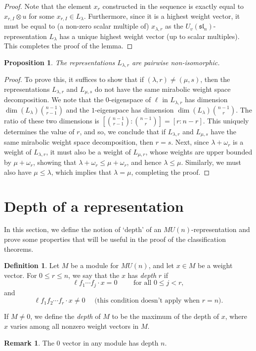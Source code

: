 \documentclass{amsart}
\numberwithin{equation}{section}
\theoremstyle{theorem}
\newtheorem{proposition}[theorem]{Proposition}
\theoremstyle{definition}
\newtheorem{remark}[theorem]{Remark}
\newtheorem{definition}[theorem]{Definition}
\newcommand{\sll}{\mathfrak{sl}}
\newcommand{\uvsln}{U_v(\sll_n)}
\begin{document}
\begin{proof}
Note that the element $x_r$ constructed in the sequence is exactly equal to $x_{r,I}\otimes u$ for some $x_{r,I}\in L_{\lambda}$. Furthermore, since it is a highest weight vector, it must be equal to (a non-zero scalar multiple of) $x_{\lambda,r}$ as the $\uvsln$-representation $L_{\lambda}$ has a unique highest weight vector (up to scalar multiples). This completes the proof of the lemma.
\end{proof}
\begin{proposition} \label{prop:nonisom}
The representations $L_{\lambda,r}$ are pairwise non-isomorphic.
\end{proposition}
\begin{proof}
To prove this, it suffices to show that if $(\lambda, r)\neq (\mu,s)$, then the representations $L_{\lambda,r}$ and $L_{\mu,s}$ do not have the same mirabolic weight space decomposition. We note that the $0$-eigenspace of $\ell$ in $L_{\lambda,r}$ has dimension $\dim(L_{\lambda}){n-1 \choose r-1}$ and the $1$-eigenspace has dimension $\dim(L_{\lambda}){n-1 \choose r}$. The ratio of these two dimensions is $[{n-1 \choose r-1}:{n-1 \choose r}]=[r:n-r]$. This uniquely determines the value of $r$, and so, we conclude that if $L_{\lambda,r}$ and $L_{\mu,s}$ have the same mirabolic weight space decomposition, then $r=s$. Next, since $\lambda+\omega_r$ is a weight of $L_{\lambda,r}$, it must also be a weight of $L_{\mu,r}$, whose weights are upper bounded by $\mu+\omega_r$, showing that $\lambda+\omega_r\leq \mu+\omega_r$, and hence $\lambda\leq\mu$. Similarly, we must also have $\mu\leq \lambda$, which implies that $\lambda=\mu$, completing the proof.
\end{proof}


\section{Depth of a representation}\label{sec:proof-prop}

In this section, we define the notion of `depth' of an $MU(n)$-representation and prove some properties that will be useful in the proof of the classification theorems.

\begin{definition}\label{def:type-r}
Let $M$ be a module for $MU(n)$, and let $x\in M$ be a weight vector. For $0\leq r\leq n$, we say that the $x$ has \emph{depth} $r$ if 
$$\ell f_1\cdots f_j \cdot x= 0\qquad \text{ for all }0\leq j<r,$$ 
and
$$\ell f_1f_2\cdots f_r\cdot  x\neq 0 \quad \text{ (this condition doesn't apply when $r=n$).}$$

If $M\neq 0$, we define the \emph{depth} of $M$ to be the maximum of the depth of $x$, where $x$ varies among all nonzero weight vectors in $M$.
\end{definition}
\begin{remark}
The $0$ vector in any module has depth $n$.
\end{remark}
\end{document}
